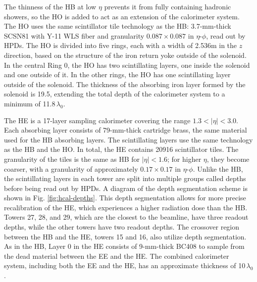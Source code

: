 The thinness of the HB at low $\eta$ prevents it from fully containing hadronic showers, so the HO is added to act as an extension of the calorimeter system. The HO uses the same scintillator tile technology as the HB: 3.7-mm-thick SCSN81 with Y-11 WLS fiber and granularity $0.087\times0.087$ in $\eta$-$\phi$, read out by HPDs. The HO is divided into five rings, each with a width of 2.536\unit{m} in the $z$ direction, based on the structure of the iron return yoke outside of the solenoid. In the central Ring 0, the HO has two scintillating layers, one inside the solenoid and one outside of it. In the other rings, the HO has one scintillating layer outside of the solenoid. The thickness of the absorbing iron layer formed by the solenoid is 19.5\cm, extending the total depth of the calorimeter system to a minimum of 11.8$\,\lambda_{0}$.

The HE is a 17-layer sampling calorimeter covering the range $1.3<|\eta|<3.0$. Each absorbing layer consists of 79-mm-thick cartridge brass, the same material used for the HB absorbing layers. The scintillating layers use the same technology as the HB and the HO. In total, the HE contains 20916 scintillator tiles. The granularity of the tiles is the same as HB for $|\eta|<1.6$; for higher $\eta$, they become coarser, with a granularity of approximately $0.17\times0.17$ in $\eta$-$\phi$. Unlike the HB, the scintillating layers in each tower are split into multiple groups called depths before being read out by HPDs. A diagram of the depth segmentation scheme is shown in Fig. \ref{fig:hcal-depths}. This depth segmentation allows for more precise recalibration of the HE, which experiences a higher radiation dose than the HB. Towers 27, 28, and 29, which are the closest to the beamline, have three readout depths, while the other towers have two readout depths. The crossover region between the HB and the HE, towers 15 and 16, also utilize depth segmentation. As in the HB, Layer 0 in the HE consists of 9-mm-thick BC408 to sample from the dead material between the EE and the HE. The combined calorimeter system, including both the EE and the HE, has an approximate thickness of 10$\,\lambda_{0}$.

